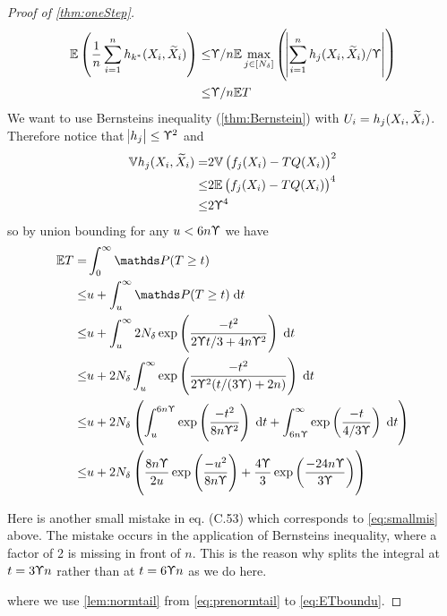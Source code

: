 \begin{proof}[Proof of \cref{thm:oneStep}]
  \begin{align}
    \mathbb{E} \left( \frac{1}{n} \sum_{i=1}^n h_{k^*}(X_i, \widetilde{X}_i) \right)
    \leq & \Upupsilon/n \mathbb{E} \max_{j \in [N_\delta]} \left(
    \abs{\sum_{i=1}^n h_j(X_i, \widetilde{X}_i)/\Upupsilon} \right)
    \\ \leq & \Upupsilon/n \mathbb{E} T 
    \label{eq:havgbound}
  \end{align}
  We want to use Bernsteins inequality (\cref{thm:Bernstein}) with
  $U_i = h_j(X_i,\widetilde{X}_i)$. Therefore notice that
  $\abs{h_j} \leq \Upupsilon^2$ and
  \begin{align}
    \mathbb{V} h_j(X_i, \widetilde{X}_i) = & 2 \mathbb{V} \left( f_j(X_i) - TQ(X_i) \right)^2
    \\ \leq & 2 \mathbb{E} \left( f_j(X_i) - TQ(X_i) \right)^4
    \\ \leq & 2 \Upupsilon^4
    \label{eq:hvarbound}
  \end{align}
  so by union bounding for any $u < 6 n \Upupsilon$ we have
  \begin{align}
    \E T = & \int_0^\infty \Prob(T \geq t)
    \\ \leq & u + \int_u^\infty \Prob(T \geq t) \difd t
    \\ \leq & u + \int_u^\infty 2 N_\delta
    \exp \left( \frac{-t^2}{2 \Yp t/3 + 4n \Yp^2} \right) \difd t
    \label{eq:smallmis}
    \\ \leq & u + 2 N_\delta \int_u^\infty 
    \exp \left( \frac{-t^2}{2 \Yp^2 (t/(3 \Yp) + 2 n )} \right) \difd t
    \\ \leq & u + 2 N_\delta \left(
      \int_u^{6 n \Yp} \exp \left( \frac{-t^2}{8 n \Yp^2} \right) \difd t
      + \int_{6 n \Yp}^\infty \exp \left( \frac{-t}{4/3 \Yp} \right) \difd t
    \right) 
    \label{eq:prenormtail}
    \\ \leq & u + 2 N_\delta \left(
      \frac{8 n \Yp}{2 u} \exp\left( \frac{-u^2}{8 n \Yp} \right)
      + \frac{4 \Yp}{3} \exp\left( \frac{-24 n \Yp}{3 \Yp} \right)
    \right) 
    \label{eq:ETboundu}
  \end{align}
  \begin{rem}
    Here is another small mistake in  eq. (C.53)
    which corresponds to \cref{eq:smallmis} above.
    The mistake occurs in the application of Bernsteins inequality,
    where a factor of 2 is missing in front of $n$.
    This is the reason why  splits the integral at
    $t=3\Upupsilon n$ rather than at $t=6\Upupsilon n$ as we do here.
    \label{rem:mistake2}
  \end{rem}
  where we use \cref{lem:normtail}
  from \cref{eq:prenormtail} to \cref{eq:ETboundu}.

\end{proof}
